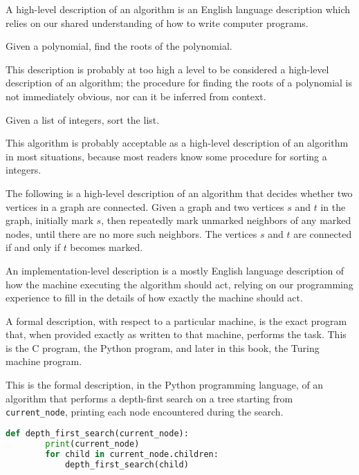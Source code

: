 A high-level description of an algorithm is an English language description which relies on our shared understanding of how to write computer programs.

\begin{example}
  Given a polynomial, find the roots of the polynomial.

  This description is probably at too high a level to be considered a high-level description of an algorithm; the procedure for finding the roots of a polynomial is not immediately obvious, nor can it be inferred from context.
\end{example}

\begin{example}
  Given a list of integers, sort the list.

  This algorithm is probably acceptable as a high-level description of an algorithm in most situations, because most readers know some procedure for sorting a integers.
\end{example}

\begin{example}
  The following is a high-level description of an algorithm that decides whether two vertices in a graph are connected.
  Given a graph and two vertices $s$ and $t$ in the graph, initially mark $s$, then repeatedly mark unmarked neighbors of any marked nodes, until there are no more such neighbors.
  The vertices $s$ and $t$ are connected if and only if $t$ becomes marked.
\end{example}

An implementation-level description is a mostly English language description of how the machine executing the algorithm should act, relying on our programming experience to fill in the details of how exactly the machine should act.

\begin{example}
\end{example}

A formal description, with respect to a particular machine, is the exact program that, when provided exactly as written to that machine, performs the task.
This is the C program, the Python program, and later in this book, the Turing machine program.

\begin{example}
  This is the formal description, in the Python programming language, of an algorithm that performs a depth-first search on a tree starting from \verb|current_node|, printing each node encountered during the search.
  \begin{lstlisting}[language=Python]
    def depth_first_search(current_node):
        print(current_node)
        for child in current_node.children:
            depth_first_search(child)
  \end{lstlisting}
\end{example}


